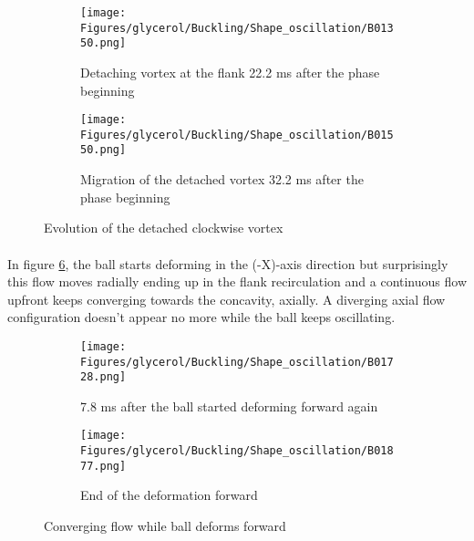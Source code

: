 \documentclass[a4paper,10pt]{report}
\begin{document}
\begin{figure}[htbp]%
	\centering%
		\begin{subfigure}[h]{0.5\textwidth}%
					\texttt{[image: Figures/glycerol/Buckling/Shape\_oscillation/B01350.png]}%
					\caption{Detaching vortex at the flank 22.2 ms after the phase beginning}%
					\label{fig:1350}%
			\end{subfigure}%
			\begin{subfigure}[h]{0.5\linewidth}%
					\texttt{[image: Figures/glycerol/Buckling/Shape\_oscillation/B01550.png]}%
					\caption{Migration of the detached vortex 32.2 ms after the phase beginning}%
					\label{fig:1550}%
			\end{subfigure}%
		\caption{Evolution of the detached clockwise vortex}
		\label{fig:dissipationmigrationVortexbottom}%
\end{figure}
\paragraph{}
In figure \ref{fig:contraryflow}, the ball starts deforming in the (-X)-axis direction but surprisingly this flow moves radially ending up in the flank recirculation and a continuous flow upfront keeps converging towards the concavity, axially. A diverging axial flow configuration doesn't appear no more while the ball keeps oscillating.
\begin{figure}[htbp]%
	\centering%
		\begin{subfigure}[h]{0.5\textwidth}%
					\texttt{[image: Figures/glycerol/Buckling/Shape\_oscillation/B01728.png]}%
					\caption{7.8 ms after the ball started deforming forward again}%
					\label{fig:1728}%
			\end{subfigure}%
			\begin{subfigure}[h]{0.5\linewidth}%
					\texttt{[image: Figures/glycerol/Buckling/Shape\_oscillation/B01877.png]}%
					\caption{End of the deformation forward}%
					\label{fig:1877}%
			\end{subfigure}%
		\caption{Converging flow while ball deforms forward}
		\label{fig:contraryflow}%
\end{figure}
\end{document}

